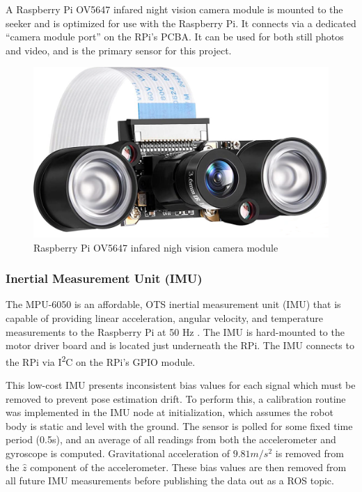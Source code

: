 \documentclass[twocolumn]{article}
\begin{document}
A Raspberry Pi OV5647 infared night vision camera module is mounted to the seeker and is optimized for use with the Raspberry Pi.  It connects via a dedicated ``camera module port'' on the RPi's PCBA. It can be used for both still photos and video, and is the primary sensor for this project.

\begin{figure}[h]
    \centering
    \includegraphics[scale=0.15]{figures/camera.png}
    \caption{Raspberry Pi OV5647 infared nigh vision camera module}
    \label{fig:raspberry_pi_cam}
\end{figure}

\subsubsection{ Inertial Measurement Unit (IMU)}
The MPU-6050 is an affordable, OTS inertial measurement unit (IMU) that is capable of providing linear acceleration, angular velocity, and temperature measurements to the Raspberry Pi at 50 Hz \cite{mpu6050}.  The IMU is hard-mounted to the motor driver board and is located just underneath the RPi. The IMU connects to the RPi via I\textsuperscript{2}C on the RPi's GPIO module.

This low-cost IMU presents inconsistent bias values for each signal which must be removed to prevent pose estimation drift. To perform this, a calibration routine was implemented in the IMU node at initialization, which assumes the robot body is static and level with the ground. The sensor is polled for some fixed time period (0.5s), and an average of all readings from both the accelerometer and gyroscope is computed. Gravitational acceleration of $9.81 m/s^2$ is removed from the $\hat{z}$ component of the accelerometer. These bias values are then removed from all future IMU measurements before publishing the data out as a ROS topic.
\end{document}
